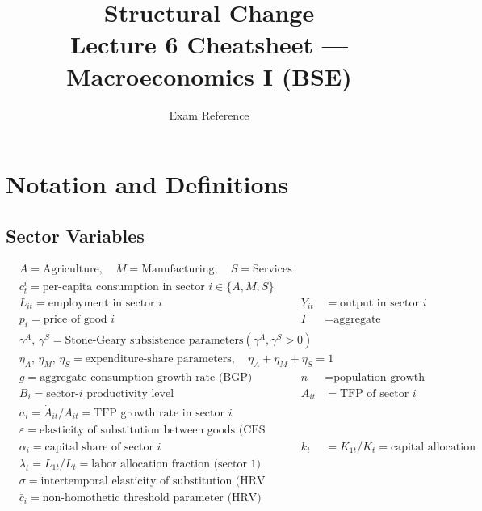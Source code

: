 \documentclass[a4paper,11pt]{article}
\title{\textbf{Structural Change}\\[0.3em]
       \large Lecture 6 Cheatsheet --- Macroeconomics I (BSE)}
\author{Exam Reference}
\date{}
\begin{document}
\maketitle
\tableofcontents
\clearpage
\pagestyle{plain}

\section{Notation and Definitions}

\subsection*{Sector Variables}
\begin{align*}
& A = \text{Agriculture}, \quad M = \text{Manufacturing}, \quad S = \text{Services}\\
& c_t^i = \text{per-capita consumption in sector } i \in \{A, M, S\}\\
& L_{it} = \text{employment in sector } i & Y_{it} &= \text{output in sector } i\\
& p_i = \text{price of good } i & I &= \text{aggregate income/expenditure}\\
& \gamma^A, \, \gamma^S = \text{Stone-Geary subsistence parameters} (\gamma^A, \gamma^S > 0)\\
& \eta_A, \, \eta_M, \, \eta_S = \text{expenditure-share parameters}, \quad \eta_A + \eta_M + \eta_S = 1\\
& g = \text{aggregate consumption growth rate (BGP)} & n &= \text{population growth rate}\\
& B_i = \text{sector-}i \text{ productivity level} & A_{it} &= \text{TFP of sector } i\\
& a_i = \dot{A}_{it}/A_{it} = \text{TFP growth rate in sector } i\\
& \varepsilon = \text{elasticity of substitution between goods (CES aggregator)}\\
& \alpha_i = \text{capital share of sector } i & k_t &= K_{1t}/K_t = \text{capital allocation fraction}\\
& \lambda_t = L_{1t}/L_t = \text{labor allocation fraction (sector 1)}\\
& \sigma = \text{intertemporal elasticity of substitution (HRV preferences)}\\
& \bar{c}_i = \text{non-homothetic threshold parameter (HRV)}
\end{align*}
\end{document}
